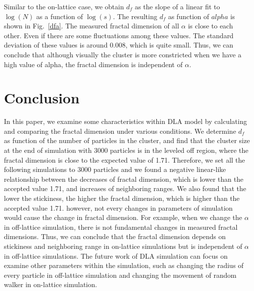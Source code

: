\documentclass[aps,preprint,groupedaddress,letterpaper]{revtex4-1}
\begin{document}
Similar to the on-lattice case, we obtain $d_f$ as the slope of a linear fit to $\log(N)$ as a function of $\log(s)$. The resulting $d_f$ as function of $alpha$ is shown in Fig.~\ref{dfa}. The measured fractal dimension of all $\alpha$ is close to each other. Even if there are some fluctuations among these values. The standard deviation of these values is around 0.008, which is quite small. Thus, we can conclude that although visually the cluster is more constricted when we have a high value of alpha, the fractal dimension is independent of $\alpha$.

\section{Conclusion}

In this paper, we examine some characteristics within DLA model by calculating and comparing the fractal dimension under various conditions. We determine $d_f$ as function of the number of particles in the cluster, and find that the cluster size at the end of simulation with 3000 particles is in the leveled off region, where the fractal dimension is close to the expected value of 1.71. Therefore, we set all the following simulations to 3000 particles and we found a negative linear-like relationship between the decreases of fractal dimension, which is lower than the accepted value 1.71, and increases of neighboring ranges. We also found that the lower the stickiness, the higher the fractal dimension, which is higher than the accepted value 1.71. however, not every changes in parameters of simulation would cause the change in fractal dimension. For example, when we change the $\alpha$ in off-lattice simulation, there is not fundamental changes in measured fractal dimensions. Thus, we can conclude that the fractal dimension depends on stickiness and neighboring range in on-lattice simulations but is independent of $\alpha$ in off-lattice simulations. The future work of DLA simulation can focus on examine other parameters within the simulation, such as changing the radius of every particle in off-lattice simulation and changing the movement of random walker in on-lattice simulation. 

  
\end{document}
